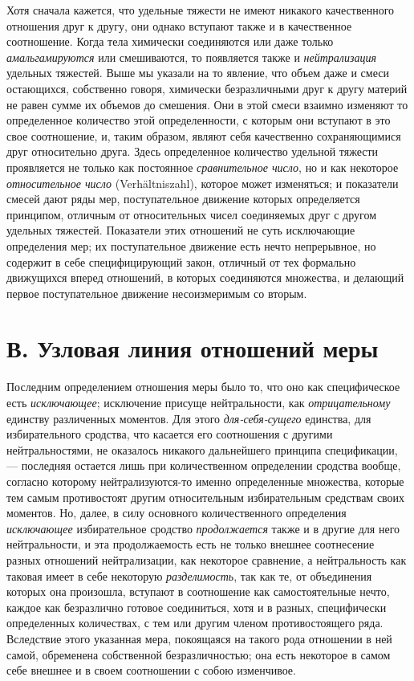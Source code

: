 Хотя сначала кажется, что удельные тяжести не имеют никакого качественного
отношения друг к другу, они однако вступают также и в качественное
соотношение. Когда тела химически соединяются или даже только
{\em амальгамируются} или смешиваются, то появляется
также и {\em нейтрализация} удельных тяжестей. Выше мы
указали на то явление, что объем даже и смеси остающихся, собственно
говоря, химически безразличными друг к другу материй не равен сумме их
объемов до смешения. Они в этой смеси взаимно изменяют то определенное
количество этой определенности, с которым они вступают в это свое
соотношение, и, таким образом, являют себя качественно сохраняющимися друг
относительно друга. Здесь определенное количество удельной тяжести
проявляется не только как постоянное {\em сравнительное
число}, но и как некоторое {\em относительное число}
(Verhältniszahl), которое может изменяться; и показатели смесей дают ряды
мер, поступательное движение которых определяется принципом, отличным от
относительных чисел соединяемых друг с другом удельных тяжестей. Показатели
этих отношений не суть исключающие определения мер; их поступательное
движение есть нечто непрерывное, но содержит в себе специфицирующий закон,
отличный от тех формально движущихся вперед отношений, в которых
соединяются множества, и делающий первое поступательное движение
несоизмеримым со вторым.


\section[В. Узловая линия отношений меры]{В. Узловая линия отношений меры}

Последним определением отношения меры было то,
что оно как специфическое есть {\em исключающее};
исключение присуще нейтральности, как
{\em отрицательному} единству различенных моментов. Для
этого {\em для-себя-сущего} единства, для
избирательного сродства, что касается его соотношения с другими
нейтральностями, не оказалось никакого дальнейшего принципа спецификации, —
последняя остается лишь при количественном определении сродства вообще,
согласно которому нейтрализуются-то именно определенные множества, которые
тем самым противостоят другим относительным избирательным средствам своих
моментов. Но, далее, в силу основного количественного определения
{\em исключающее} избирательное сродство
{\em продолжается} также и в другие для него
нейтральности, и эта продолжаемость есть не только внешнее соотнесение
разных отношений нейтрализации, как некоторое сравнение, а нейтральность
как таковая имеет в себе некоторую {\em разделимость},
так как те, от объединения которых она произошла, вступают в соотношение
как самостоятельные нечто, каждое как безразлично готовое соединиться, хотя
и в разных, специфически определенных количествах, с тем или другим членом
противостоящего ряда. Вследствие этого указанная мера, покоящаяся на такого
рода отношении в ней самой, обременена собственной безразличностью; она
есть некоторое в самом себе внешнее и в своем соотношении с собою
изменчивое.

